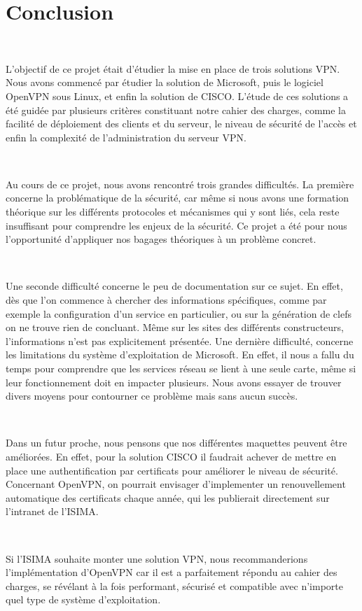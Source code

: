 \section*{Conclusion}

~

L'objectif de ce projet était d'étudier la mise en place de trois solutions VPN. Nous avons commencé par étudier la solution de Microsoft, puis le logiciel OpenVPN sous Linux, et enfin la solution de CISCO. L'étude de ces solutions a été guidée par plusieurs critères constituant notre cahier des charges, comme la facilité de déploiement des clients et du serveur, le niveau de sécurité de l'accès et enfin la complexité de l'administration du serveur VPN.

~

Au cours de ce projet, nous avons rencontré trois grandes difficultés. La première concerne la problématique de la sécurité, car même si nous avons une formation théorique sur les différents protocoles et mécanismes qui y sont liés, cela reste insuffisant pour comprendre les enjeux de la sécurité. Ce projet a été pour nous l'opportunité d'appliquer nos bagages théoriques à un problème concret.

~

Une seconde difficulté concerne le peu de documentation sur ce sujet. En effet, dès que l'on commence à chercher des informations spécifiques, comme par exemple la configuration d'un service en particulier, ou sur la génération de clefs on ne trouve rien de concluant. Même sur les sites des différents constructeurs, l'informations n'est pas explicitement présentée.
Une dernière difficulté, concerne les limitations du système d'exploitation de Microsoft. En effet, il nous a fallu du temps pour comprendre que les services réseau se lient à une seule carte, même si leur fonctionnement doit en impacter plusieurs. Nous avons essayer de trouver divers moyens pour contourner ce problème mais sans aucun succès.

~

Dans un futur proche, nous pensons que nos différentes maquettes peuvent être améliorées. En effet, pour la solution CISCO il faudrait achever de mettre en place une authentification par certificats pour améliorer le niveau de sécurité. Concernant OpenVPN, on pourrait envisager d'implementer un renouvellement automatique des certificats chaque année, qui les publierait directement sur l'intranet de l'ISIMA.

~

Si l'ISIMA souhaite monter une solution VPN, nous recommanderions l'implémentation d'OpenVPN car il est a parfaitement répondu au cahier des charges, se révélant à la fois performant, sécurisé et compatible avec n'importe quel type de système d'exploitation.

\pagebreak
